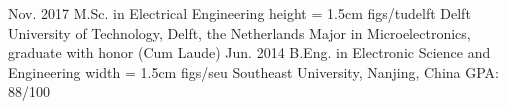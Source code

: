 %
%
%
%
%
%
\begin{educations}
	\education
    {Nov. 2017}			{M.Sc. in Electrical Engineering}
    {height = 1.5cm}			{figs/tudelft}
    {}		{Delft University of Technology, Delft, the Netherlands}
    {}		{Major in Microelectronics, graduate with honor (Cum Laude)}
  \universitySeparator
  \education
	  {Jun. 2014}			{B.Eng. in Electronic Science and Engineering}
	  {width = 1.5cm}			{figs/seu}
	  {}		{Southeast University, Nanjing, China}
	  {}		{GPA: 88/100}
\end{educations}
